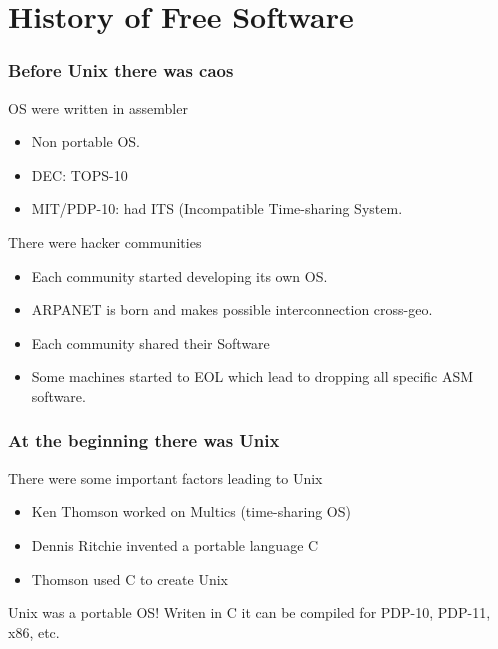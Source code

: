 \documentclass[hyperref={pdfpagelabels=false},xcolor=pst,pdf,fragile]{beamer}
\begin{document}
\section{History of Free Software}

\begin{frame}
  \frametitle{Before Unix there was caos}

  \begin{block}{OS were written in assembler}
	  \begin{itemize}
		  \item Non portable OS.
		  \item DEC: TOPS-10
		  \item MIT/PDP-10: had ITS (Incompatible Time-sharing System.
	  \end{itemize}
  \end{block}

  \pause
  There were hacker communities
  \begin{itemize}
	  \item Each community started developing its own OS.
	  \item ARPANET is born and makes possible interconnection cross-geo.
	  \item \alert{Each community shared their Software}
	  \item Some machines started to EOL which lead to dropping all specific
		  ASM software.
  \end{itemize}

\end{frame}

\begin{frame}
  \frametitle{At the beginning there was Unix}

  There were some important factors leading to Unix

  \begin{itemize}
	  \item Ken Thomson worked on Multics (time-sharing OS)
	  \item Dennis Ritchie invented a portable language C
	  \item Thomson used C to create Unix
  \end{itemize}

  \pause

  \begin{alertblock}{Unix was a portable OS!}
	  Writen in C it can be compiled for PDP-10, PDP-11, x86, etc.
  \end{alertblock}

\end{frame}
\end{document}
